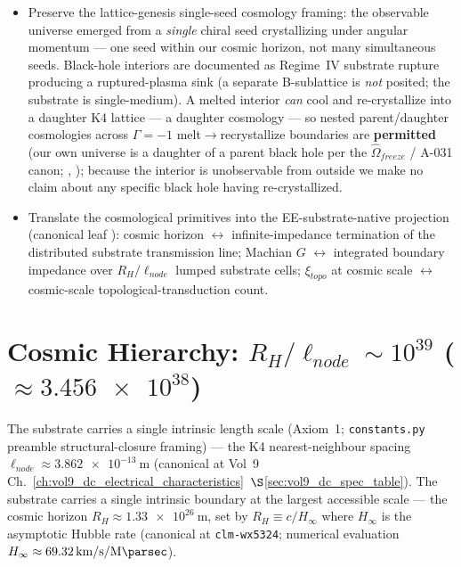\begin{objectivebox}
\begin{itemize}
    \item Preserve the lattice-genesis single-seed cosmology framing: the observable universe emerged from a \emph{single} chiral seed crystallizing under angular momentum --- one seed within our cosmic horizon, not many simultaneous seeds. Black-hole interiors are documented as Regime~IV substrate rupture producing a ruptured-plasma sink (a separate B-sublattice is \emph{not} posited; the substrate is single-medium). A melted interior \emph{can} cool and re-crystallize into a daughter K4 lattice --- a daughter cosmology --- so nested parent/daughter cosmologies across $\Gamma=-1$\gammaundeclared{} melt$\to$recrystallize boundaries are \textbf{permitted} (our own universe is a daughter of a parent black hole per the $\hat{\Omega}_{freeze}$ / A-031 canon; , ); because the interior is unobservable from outside we make no claim about any specific black hole having re-crystallized.
    \item Translate the cosmological primitives into the EE-substrate-native projection (canonical leaf ): cosmic horizon $\leftrightarrow$ infinite-impedance termination of the distributed substrate transmission line; Machian $G$ $\leftrightarrow$ integrated boundary impedance over $R_H/\ell_{node}$ lumped substrate cells; $\xi_{topo}$ at cosmic scale $\leftrightarrow$ cosmic-scale topological-transduction count.
\end{itemize}
\end{objectivebox}

\section{Cosmic Hierarchy: $R_H / \ell_{node} \sim 10^{39}$ ($\approx \num{3.456e38}$)}
\label{sec:vol9_cosmo_hierarchy}

The substrate carries a single intrinsic length scale (Axiom~1; \texttt{constants.py} preamble structural-closure framing) --- the K4 nearest-neighbour spacing $\ell_{node} \approx \qty{3.862e-13}{\metre}$ (canonical at Vol~9 Ch.~\ref{ch:vol9_dc_electrical_characteristics}~$\S$\ref{sec:vol9_dc_spec_table}). The substrate carries a single intrinsic boundary at the largest accessible scale --- the cosmic horizon $R_H \approx \qty{1.33e26}{\metre}$, set by $R_H \equiv c / H_\infty$ where $H_\infty$ is the asymptotic Hubble rate (canonical at  \texttt{clm-wx5324}; numerical evaluation $H_\infty \approx \qty{69.32}{\kilo\metre\per\second\per\mega\parsec}$).

